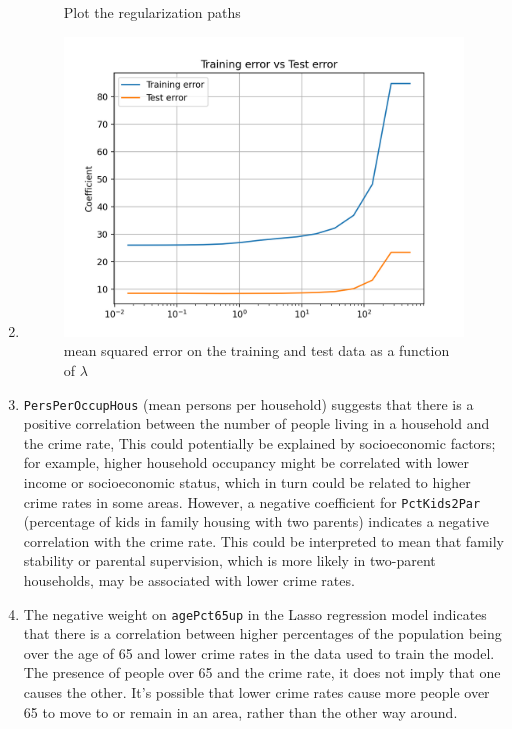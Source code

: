 \documentclass{article}
\begin{document}
\begin{sloppypar}
\begin{aprob}
\begin{enumerate}
\begin{figure}[!h]
                \caption{Plot the regularization paths}
                \label{fig:reg_paths}
            \end{figure}
            \item \begin{figure}[!h]
                \centering
                \includegraphics[width=.5\textwidth]{./img/6plot3.png}
                \caption{mean squared error on the training and test data as a function of $\lambda$}
                \label{fig:mse}
            \end{figure}
            \item \texttt{PersPerOccupHous} (mean persons per household) suggests that there is a positive correlation between the number of people living in a household and the crime rate,
            This could potentially be explained by socioeconomic factors; for example, higher household occupancy might be correlated with lower income or socioeconomic status, which in turn could be related to higher crime rates in some areas.
            However, a negative coefficient for  \texttt{PctKids2Par} (percentage of kids in family housing with two parents) indicates a negative correlation with the crime rate.
            This could be interpreted to mean that family stability or parental supervision, which is more likely in two-parent households, may be associated with lower crime rates.
            \item The negative weight on \texttt{agePct65up} in the Lasso regression model indicates that there is a correlation between higher percentages of the population being over the age of 65 and lower crime rates in the data used to train the model.
            The presence of people over 65 and the crime rate, it does not imply that one causes the other.
            It's possible that lower crime rates cause more people over 65 to move to or remain in an area, rather than the other way around.
        \end{enumerate}
\end{aprob}


\end{sloppypar}
\end{document}
